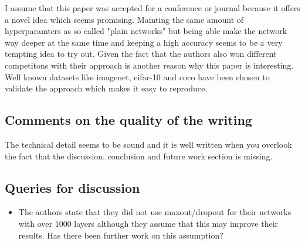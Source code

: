 \documentclass[a4paper]{article}
\begin{document}
I assume that this paper was accepted for a conference or journal because it offers a novel idea which seems promising. Mainting the same amount of hyperparamters as so called "plain networks" but being able make the network way deeper at the same time and keeping a high accuracy seems to be a very tempting idea to try out. Given the fact that the authors also won different competitons with their approach is another reason why this paper is interesting. Well known datasets like imagenet, cifar-10 and coco have been chosen to validate the approach which makes it easy to reproduce.

\subsection{Comments on the quality of the writing}

The technical detail seems to be sound and it is well written when you overlook the fact that the discussion, conclusion and future work section is missing.

\subsection{Queries for discussion}

\begin{itemize}
	\item The authors state that they did not use maxout/dropout for their networks with over 1000 layers although they assume that this may improve their results. Has there been further work on this assumption?%
\end{itemize}
\end{document}
